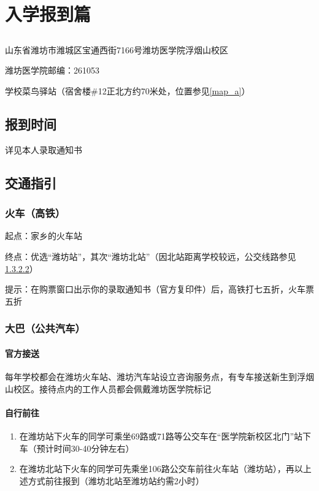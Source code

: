 \chapter[入学报到篇]{入学报到篇}
\section[报到地址（也是快递地址）]{}
山东省潍坊市潍城区宝通西街7166号潍坊医学院浮烟山校区

潍坊医学院邮编：261053

学校菜鸟驿站（宿舍楼\#12正北方约70米处，位置参见\uline{\ref{map_a}}）

\section[报到时间]{报到时间}
详见本人录取通知书

\section[交通指引]{交通指引}
\subsection[火车（高铁）]{火车（高铁）}
起点：家乡的火车站

终点：优选“潍坊站”，其次“潍坊北站”（因北站距离学校较远，公交线路参见\uline{\ref{bus}}）

提示：在购票窗口出示你的录取通知书（官方复印件）后，高铁打七五折，火车票五折

\subsection[大巴（公共汽车）]{大巴（公共汽车）}

\subsubsection[官方接送]{官方接送}
每年学校都会在潍坊火车站、潍坊汽车站设立咨询服务点，有专车接送新生到浮烟山校区。接待点内的工作人员都会佩戴潍坊医学院标记

\subsubsection[自行前往]{自行前往}
\label{bus}
\begin{enumerate}
      \item 在潍坊站下火车的同学可乘坐69路或71路等公交车在“医学院新校区北门”站下车（预计时间30-40分钟左右）
      \item 在潍坊北站下火车的同学可先乘坐106路公交车前往火车站（潍坊站），再以上述方式前往报到（潍坊北站至潍坊站约需2小时）
\end{enumerate}

